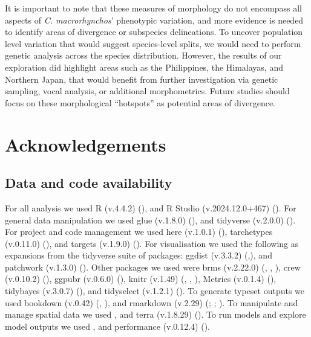 \documentclass[10pt,a4paper]{article}
\begin{document}
It is important to note that these measures of morphology do not encompass all aspects of \emph{C. macrorhynchos}' phenotypic variation, and more evidence is needed to identify areas of divergence or subspecies delineations.
To uncover population level variation that would suggest species-level splits, we would need to perform genetic analysis across the species distribution.
However, the results of our exploration did highlight areas such as the Philippines, the Himalayas, and Northern Japan, that would benefit from further investigation via genetic sampling, vocal analysis, or additional morphometrics.
Future studies should focus on these morphological ``hotspots'' as potential areas of divergence.

\section{Acknowledgements}\label{acknowledgements}

\subsection{Data and code availability}\label{data-and-code-availability}

For all analysis we used R (v.4.4.2) (), and R Studio (v.2024.12.0+467) (). For general data manipulation we used glue (v.1.8.0) (), and tidyverse (v.2.0.0) (). For project and code management we used here (v.1.0.1) (), tarchetypes (v.0.11.0) (), and targets (v.1.9.0) (). For visualisation we used the following as expansions from the tidyverse suite of packages: ggdist (v.3.3.2) (,), and patchwork (v.1.3.0) (). Other packages we used were brms (v.2.22.0) (, , ), crew (v.0.10.2) (), ggpubr (v.0.6.0) (), knitr (v.1.49) (, , ), Metrics (v.0.1.4) (), tidybayes (v.3.0.7) (), and tidyselect (v.1.2.1) (). To generate typeset outputs we used bookdown (v.0.42) (, ), and rmarkdown (v.2.29) (; ; ). To manipulate and manage spatial data we used , and terra (v.1.8.29) (). To run models and explore model outputs we used , and performance (v.0.12.4) ().
\end{document}
